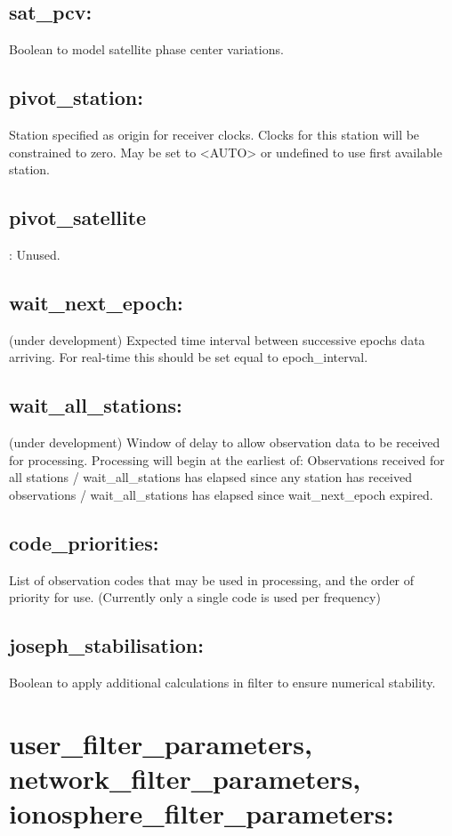 \subsection{sat\_pcv:}
Boolean to model satellite phase center variations.
\subsection{pivot\_station:}
Station specified as origin for receiver clocks. Clocks for this station will be constrained to zero. May be set to <AUTO> or undefined to use first available station.
\subsection{pivot\_satellite}:
Unused.
\subsection{wait\_next\_epoch:}
(under development)
Expected time interval between successive epochs data arriving. For real-time this should be set equal to epoch\_interval.
\subsection{wait\_all\_stations:}
(under development)
Window of delay to allow observation data to be received for processing.
Processing will begin at the earliest of: Observations received for all stations / wait\_all\_stations has elapsed since any station has received observations / wait\_all\_stations has elapsed since wait\_next\_epoch expired.

\subsection{code\_priorities:}
List of observation codes that may be used in processing, and the order of priority for use. (Currently only a single code is used per frequency)

\subsection{joseph\_stabilisation:}
Boolean to apply additional calculations in filter to ensure numerical stability.











\section{user\_filter\_parameters, network\_filter\_parameters, ionosphere\_filter\_parameters:}

